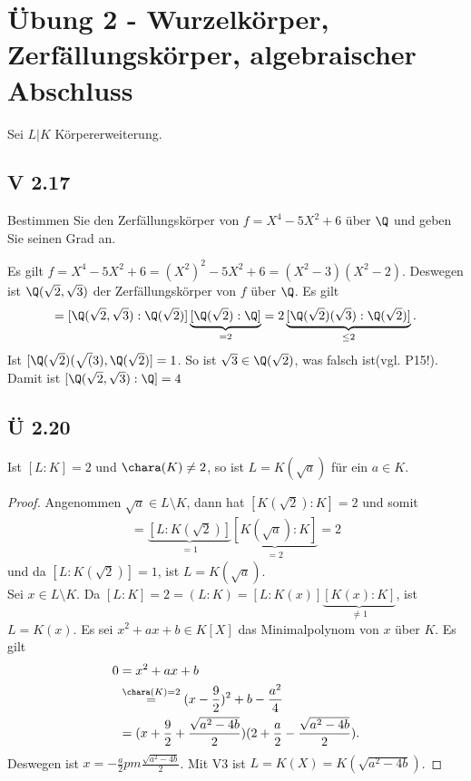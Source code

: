 
\section{Übung 2 - Wurzelkörper, Zerfällungskörper, algebraischer Abschluss}
Sei $L \vert K$ Körpererweiterung.
\subsection{V 2.17}
Bestimmen Sie den Zerfällungskörper von $f = X^4 - 5X^2 +6$ über $\Q$ und geben Sie seinen Grad an.

\begin{lösung}
	Es gilt $f = X^4 - 5X^2 + 6 = (X^2)^2 - 5X^2 +6 = (X^2-3)(X^2-2)$. Deswegen ist $\Q(\sqrt{2}, \sqrt{3})$ der Zerfällungskörper von $f$ über $\Q$. Es gilt
	\begin{align*}
		[\Q(\sqrt{2}), \sqrt{3}: \Q] = [\Q(\sqrt{2}, \sqrt{3}): \Q(\sqrt{2})]\underbrace{[\Q(\sqrt{2}): \Q]}_{=2} = 2\underbrace{[\Q(\sqrt{2})(\sqrt{3}):\Q(\sqrt{2})]}_{\le 2}.
	\end{align*}
	Ist $[\Q(\sqrt{2})(\sqrt(3),\Q(\sqrt{2})] = 1$. So ist $\sqrt{3} \in \Q(\sqrt{2})$, was falsch ist(vgl. P15!). Damit ist $[\Q(\sqrt{2},\sqrt{3}):\Q] = 4$
\end{lösung}

\subsection{Ü 2.20}
Ist $[L:K] = 2$ und $\chara(K) \neq 2$, so ist $L = K(\sqrt{a})$ für ein $a \in K$.

\begin{proof}
	Angenommen $\sqrt{a} \in L \setminus K$, dann hat $[K(\sqrt{2}):K] =2$ und somit 
	\begin{align*}
		[L:K] = \underbrace{[L:K(\sqrt{2})]}_{=1}\underbrace{[K(\sqrt{a}):K]}_{=2} = 2
	\end{align*}
	und da $[L:K(\sqrt{2})] = 1$, ist $L=K(\sqrt{a})$.\\
	Sei $x \in L\setminus K$. Da $[L:K] = 2 = (L:K) = [L:K(x)]\underbrace{[K(x):K]}_{\neq 1}$, ist $L=K(x)$. Es sei
	$x^2 + ax + b \in K[X]$ das Minimalpolynom von $x$ über $K$. Es gilt
	\begin{align*}
		0&=x^2 + ax + b\\
		&\overset{\chara(K) =2}{=} (x-\frac{9}{2})^2 + b - \frac{a^2}{4}\\
		&= (x + \frac{9}{2} + \frac{\sqrt{a^2 - 4b}}{2})(2 + \frac{a}{2} - \frac{\sqrt{a^2 - 4b}}{2}).
	\end{align*}
	Deswegen ist $x  = - \frac{a}{2} pm \frac{\sqrt{a^2 - 4b}}{2}$. Mit V3 ist $L = K(X) = K(\sqrt{a^2-4b})$.
\end{proof}

